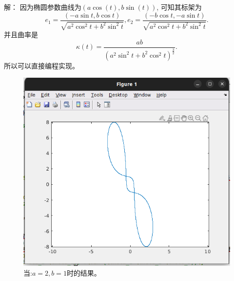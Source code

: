\documentclass{article}
\begin{document}
\begin{itemize}
	解： 因为椭圆参数曲线为$(a\cos(t), b\sin(t))$, 可知其标架为 
	\[e_1 = \dfrac{(-a\sin t, b \cos t)}{\sqrt{a^2 \cos^2t + b^2 \sin^2t}}, e_2 = \dfrac{(- b \cos t, -a\sin t)}{\sqrt{a^2 \cos^2t + b^2 \sin^2t}}.\]
	并且曲率是
	\[\kappa (t) =  \dfrac{ab}{(a^2\sin^2t + b^2 \cos^2 t)^{\frac{3}{2}}}.\]
	所以可以直接编程实现。
	\begin{figure}[hptb]
		\centering
		\includegraphics[width=0.5\linewidth]{./res2.png}
		\caption{当:$a = 2, b = 1$时的结果。}
	\end{figure}
\end{itemize}
	
\end{document}

